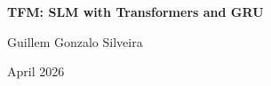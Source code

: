 \begin{titlepage}
    \centering
    \vspace*{4cm}
    {\huge \bfseries TFM: SLM with Transformers and GRU \par}
    \vspace{1.5cm}
    {\Large Guillem Gonzalo Silveira \par}
    \vspace{1.5cm}
    {\large April 2026 \par}
    \vfill
    \conteoTotal
    \vspace{1cm}
\end{titlepage}